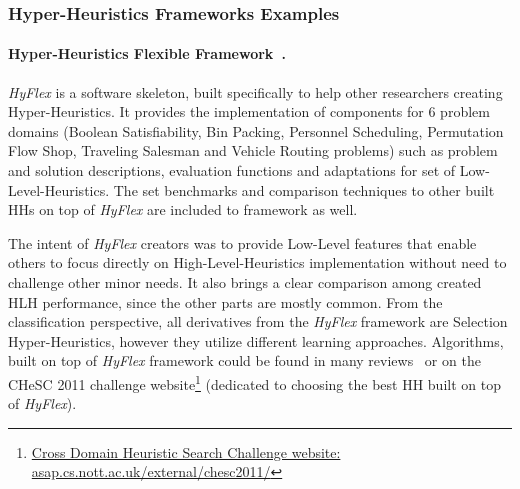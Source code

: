 \subsubsection{Hyper-Heuristics Frameworks Examples}\label{bg: hh fw examples}
\paragraph{Hyper-Heuristics Flexible Framework~\cite{ochoa2012hyflex}.} \textit{HyFlex} is a software skeleton, built specifically to help other researchers creating Hyper-Heuristics. It provides the implementation of components for 6 problem domains (Boolean Satisfiability, Bin Packing, Personnel Scheduling, Permutation Flow Shop, Traveling Salesman and Vehicle Routing problems) such as problem and solution descriptions, evaluation functions and adaptations for set of Low-Level-Heuristics. The set benchmarks and comparison techniques to other built HHs on top of \textit{HyFlex} are included to framework as well. 

The intent of \textit{HyFlex} creators was to provide Low-Level features that enable others to focus directly on High-Level-Heuristics implementation without need to challenge other minor needs. It also brings a clear comparison among created HLH performance, since the other parts are mostly common. From the classification perspective, all derivatives from the \textit{HyFlex} framework are Selection Hyper-Heuristics, however they utilize different learning approaches. Algorithms, built on top of \textit{HyFlex} framework could be found in many reviews~\cite{misir2012intelligent,ryser2014review,drake2019recent} or on the CHeSC 2011 challenge website\footnote[1]{\href{http://www.asap.cs.nott.ac.uk/external/chesc2011/}{Cross Domain Heuristic Search Challenge website: asap.cs.nott.ac.uk/external/chesc2011/}} (dedicated to choosing the best HH built on top of \textit{HyFlex}).

